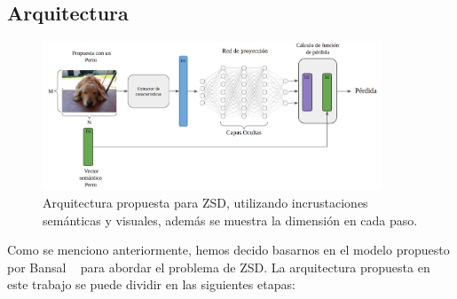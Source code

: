 \subsection{Arquitectura} \label{ssec:arquitectura}
\begin{figure}
	\centering
	\includegraphics[width=0.9\textwidth]{img/arquitectura.png}
	\caption{Arquitectura propuesta para ZSD, utilizando incrustaciones semánticas y visuales, además se muestra la dimensión en cada paso.}
	\label{fig:arqutectura}
\end{figure}
Como se menciono anteriormente, hemos decido basarnos en el modelo propuesto por Bansal \etal~\cite{bansal2018zero} para abordar el problema de ZSD. La arquitectura propuesta en este  trabajo se puede dividir en las siguientes etapas:
